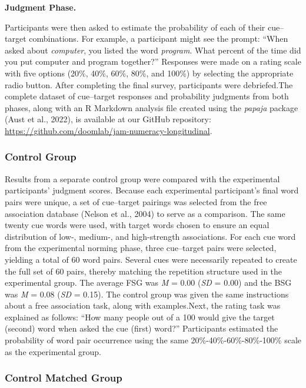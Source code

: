 \documentclass[
  man,floatsintext]{apa7}
\begin{document}
\textbf{Judgment Phase.}

Participants were then asked to estimate the probability of each of
their cue--target combinations. For example, a participant might see the
prompt: ``When asked about \emph{computer}, you listed the word \emph{program}.
What percent of the time did you put computer and program together?''
Responses were made on a rating scale with five options (20\%, 40\%, 60\%,
80\%, and 100\%) by selecting the appropriate radio button. After
completing the final survey, participants were debriefed.The complete
dataset of cue--target responses and probability judgments from both
phases, along with an R Markdown analysis file created using the
\emph{papaja} package (Aust et al., 2022), is available at our GitHub repository:
\url{https://github.com/doomlab/jam-numeracy-longitudinal}.

\subsubsection{Control Group}\label{control-group}

Results from a separate control group were compared with the
experimental participants' judgment scores. Because each experimental
participant's final word pairs were unique, a set of cue--target pairings
was selected from the free association database (Nelson et al., 2004) to serve
as a comparison. The same twenty cue words were used, with target words
chosen to ensure an equal distribution of low-, medium-, and
high-strength associations. For each cue word from the experimental
norming phase, three cue--target pairs were selected, yielding a total of
60 word pairs. Several cues were necessarily repeated to create the full
set of 60 pairs, thereby matching the repetition structure used in the
experimental group. The average FSG was \emph{M} =
0.00 (\emph{SD} =
0.00) and the BSG was \emph{M} =
0.08 (\emph{SD} =
0.15). The control group was
given the same instructions about a free association task, along with
examples.Next, the rating task was explained as follows: ``How many
people out of a 100 would give the target (second) word when asked the
cue (first) word?'' Participants estimated the probability of word pair
occurrence using the same 20\%-40\%-60\%-80\%-100\% scale as the experimental
group.

\subsubsection{Control Matched Group}\label{control-matched-group}
\end{document}
